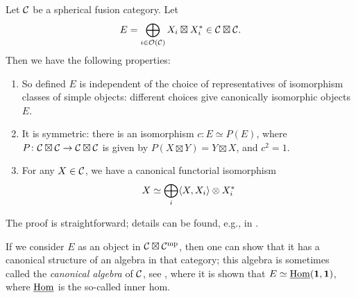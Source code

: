 \begin{lemma}\label{l:spherical-E}
  Let $\mathcal{C}$ be a spherical fusion category. Let
  \begin{equation}\label{e:spherical-E}
    E = \bigoplus_{i\in \mathcal{O}(\mathcal{C})} X_i\boxtimes X_i^*\in \mathcal{C}\boxtimes\mathcal{C}.
  \end{equation}
  Then we have the following properties:
  \begin{enumerate}
    \item So defined $E$ is independent of the choice of representatives of
    isomorphism classes of simple objects: different choices give canonically
    isomorphic objects $E$.

    \item It is symmetric: there is an isomorphism $c\colon E\simeq P(E)$, where
    $P \colon \mathcal{C}\boxtimes\mathcal{C} \to \mathcal{C}\boxtimes \mathcal{C}$ is given by
    $P(X\boxtimes Y)= Y\boxtimes X$, and $c^2=1$.

    \item For any $X\in \mathcal{C}$, we have a canonical functorial isomorphism
    $$
      X \simeq \bigoplus_i\langle X, X_i\rangle\otimes X_i^*
    $$
  \end{enumerate}
\end{lemma}
 The proof  is straightforward; details can be found, e.g.,
  in \cite{balsam-kirillov}.
\begin{remark}
  If we consider $E$ as an object in $\mathcal{C}\boxtimes\mathcal{C}^{\mathrm{mp}}$, then one can
  show that it has a canonical structure of an algebra in that category; this
  algebra is sometimes called the \emph{canonical algebra} of $\mathcal{C}$, see
  \cite[Example 7.9.14]{etingof-fusion}, where it is shown that $E\simeq
  \underline{\operatorname{Hom}}(\mathbf{1},\mathbf{1})$, where $\underline{\operatorname{Hom}}$ is the so-called inner
  hom.
\end{remark}

